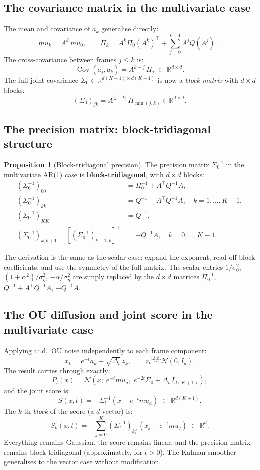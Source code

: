 \documentclass[12pt, a4paper]{article}
\def\ba{a}%
\def\bx{x}%
\def\bmu{mu}%
\def\bm#1{#1}%
\theoremstyle{definition}
\newtheorem{proposition}{Proposition}[section]
\newcommand{\R}{\mathbb{R}}
\newcommand{\Cov}{\operatorname{Cov}}
\newcommand{\N}{\mathcal{N}}
\newcommand{\ba}{\bm{a}}
\newcommand{\bx}{\bm{x}}
\newcommand{\bmu}{\bm{\mu}}
\newcommand{\dt}{\Delta_t}
\begin{document}
\subsection{The covariance matrix in the multivariate case}

The mean and covariance of $\ba_k$ generalise directly:
\[
  \bmu_k = A^k\,\bmu_0,
  \qquad
  \Pi_k = A^k\Pi_0(A^k)^\top + \sum_{j=0}^{k-1}A^j Q (A^j)^\top.
\]
The cross-covariance between frames $j \leq k$ is:
\[
  \Cov(\ba_j, \ba_k) = A^{k-j}\,\Pi_j \;\in\; \R^{d\times d}.
\]
The full joint covariance $\Sigma_0 \in \R^{d(K+1)\times d(K+1)}$
is now a \emph{block matrix} with $d\times d$ blocks:
\[
  (\Sigma_0)_{jk} = A^{|j-k|}\,\Pi_{\min(j,k)} \in \R^{d\times d}.
\]

\subsection{The precision matrix: block-tridiagonal structure}

\begin{proposition}[Block-tridiagonal precision]
The precision matrix $\Sigma_0^{-1}$ in the multivariate AR(1) case
is \textbf{block-tridiagonal}, with $d\times d$ blocks:
\begin{align*}
  (\Sigma_0^{-1})_{00} &= \Pi_0^{-1} + A^\top Q^{-1} A, \\
  (\Sigma_0^{-1})_{kk} &= Q^{-1} + A^\top Q^{-1} A,
    \quad k = 1,\ldots,K-1,\\
  (\Sigma_0^{-1})_{KK} &= Q^{-1}, \\
  (\Sigma_0^{-1})_{k,k+1} = [(\Sigma_0^{-1})_{k+1,k}]^\top
    &= -Q^{-1}A, \quad k = 0,\ldots,K-1.
\end{align*}
\end{proposition}

The derivation is the same as the scalar case: expand the exponent,
read off block coefficients, and use the symmetry of the full matrix.
The scalar entries $1/\sigma_0^2$, $(1+\alpha^2)/\sigma_\eta^2$,
$-\alpha/\sigma_\eta^2$ are simply replaced by the $d\times d$ matrices
$\Pi_0^{-1}$, $Q^{-1}+A^\top Q^{-1}A$, $-Q^{-1}A$.

\subsection{The OU diffusion and joint score in the multivariate case}

Applying i.i.d.\ OU noise independently to each frame component:
\[
  \bx_k = e^{-t}\ba_k + \sqrt{\dt}\,\bm{z}_k,
  \qquad
  \bm{z}_k \overset{\mathrm{i.i.d.}}{\sim} \N(\bm{0}, I_d).
\]
The result carries through exactly:
\[
  P_t(\bx) = \N\!\left(\bx;\; e^{-t}\bmu_a,\;
    e^{-2t}\Sigma_0 + \dt\, I_{d(K+1)}\right),
\]
and the joint score is:
\[
  \bm{S}(\bx,t) = -\Sigma_t^{-1}(\bx - e^{-t}\bmu_a)
  \;\in\; \R^{d(K+1)}.
\]
The $k$-th \emph{block} of the score (a $d$-vector) is:
\[
  \bm{S}_k(\bx,t)
  = -\sum_{j=0}^{K}(\Sigma_t^{-1})_{kj}\,(\bx_j - e^{-t}\bmu_j)
  \;\in\; \R^d.
\]
Everything remains Gaussian, the score remains linear, and the
precision matrix remains block-tridiagonal (approximately, for $t>0$).
The Kalman smoother generalises to the vector case without modification.
\end{document}
